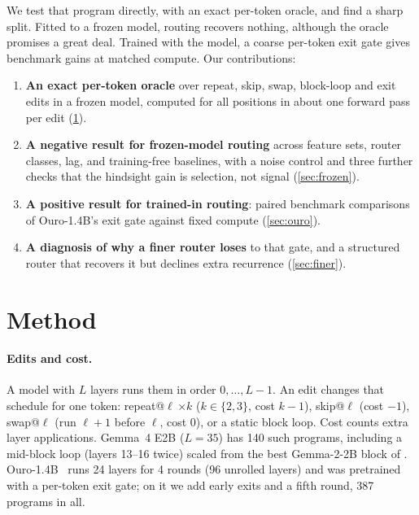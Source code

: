 \documentclass[11pt]{article}
\newcommand{\op}[1]{\textsf{#1}}
\begin{document}
We test that program directly, with an exact per-token oracle, and find a sharp split. Fitted to a frozen
model, routing recovers nothing, although the oracle promises a great deal. Trained with the model, a
coarse per-token exit gate gives benchmark gains at matched compute. Our contributions:
\begin{enumerate}
  \item \textbf{An exact per-token oracle} over repeat, skip, swap, block-loop and exit edits in a frozen
        model, computed for all positions in about one forward pass per edit (\cref{sec:method}).
  \item \textbf{A negative result for frozen-model routing} across feature sets, router classes, lag, and
        training-free baselines, with a noise control and three further checks that the hindsight gain is selection,
        not signal (\cref{sec:frozen}).
  \item \textbf{A positive result for trained-in routing}: paired benchmark comparisons of Ouro-1.4B's exit
        gate against fixed compute (\cref{sec:ouro}).
  \item \textbf{A diagnosis of why a finer router loses} to that gate, and a structured router that
        recovers it but declines extra recurrence (\cref{sec:finer}).
\end{enumerate}

\section{Method}
\label{sec:method}

\paragraph{Edits and cost.}
A model with $L$ layers runs them in order $0,\dots,L-1$. An edit changes that schedule for one token:
\op{repeat}@$\ell$\,$\times k$ ($k\in\{2,3\}$, cost $k-1$), \op{skip}@$\ell$ (cost $-1$), \op{swap}@$\ell$ (run
$\ell+1$ before $\ell$, cost 0), or a static block loop. Cost counts extra layer applications. Gemma~4 E2B
($L=35$) has 140 such programs, including a mid-block loop (layers 13--16 twice) scaled from the best
Gemma-2-2B block of \citet{lys2026innerloop}. Ouro-1.4B~\citep{zhu2025ouro} runs 24 layers for 4 rounds
(96 unrolled layers) and was pretrained with a per-token exit gate; on it we add early exits and a fifth
round, 387 programs in all.
\end{document}
